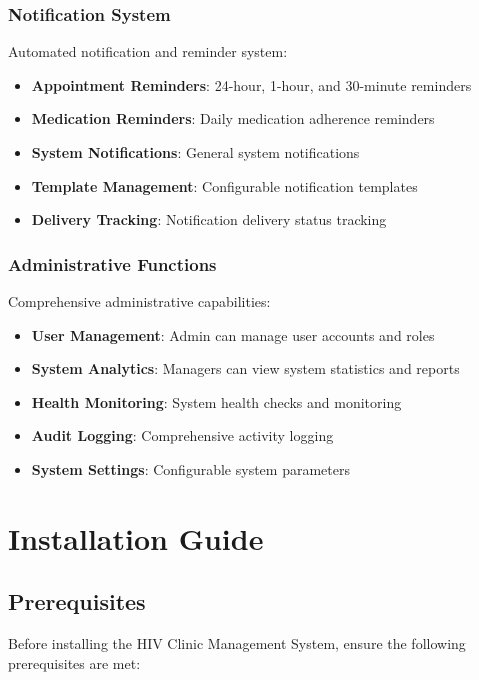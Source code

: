 \documentclass[12pt,a4paper]{article}
\begin{document}
\subsubsection{Notification System}

Automated notification and reminder system:

\begin{itemize}
    \item \textbf{Appointment Reminders}: 24-hour, 1-hour, and 30-minute reminders
    \item \textbf{Medication Reminders}: Daily medication adherence reminders
    \item \textbf{System Notifications}: General system notifications
    \item \textbf{Template Management}: Configurable notification templates
    \item \textbf{Delivery Tracking}: Notification delivery status tracking
\end{itemize}

\subsubsection{Administrative Functions}

Comprehensive administrative capabilities:

\begin{itemize}
    \item \textbf{User Management}: Admin can manage user accounts and roles
    \item \textbf{System Analytics}: Managers can view system statistics and reports
    \item \textbf{Health Monitoring}: System health checks and monitoring
    \item \textbf{Audit Logging}: Comprehensive activity logging
    \item \textbf{System Settings}: Configurable system parameters
\end{itemize}

\section{Installation Guide}

\subsection{Prerequisites}

Before installing the HIV Clinic Management System, ensure the following prerequisites are met:
\end{document}
